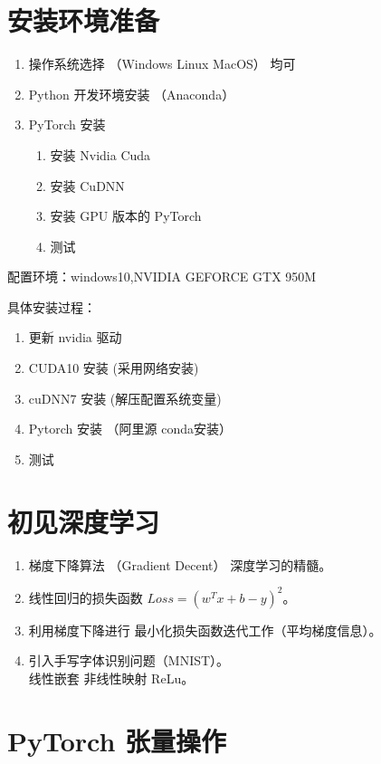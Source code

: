 \section{安装环境准备}
\begin{enumerate}
  \item 操作系统选择 （Windows Linux MacOS） 均可
  \item Python 开发环境安装 （Anaconda）
  \item PyTorch 安装
  \begin{enumerate}
    \item 安装 Nvidia Cuda
    \item 安装 CuDNN
    \item 安装 GPU 版本的 PyTorch
    \item 测试
  \end{enumerate}
\end{enumerate}

配置环境：windows10,NVIDIA GEFORCE GTX 950M

具体安装过程：
\begin{enumerate}
  \item 更新 nvidia 驱动
  \item CUDA10 安装 (采用网络安装)
  \item cuDNN7 安装 (解压配置系统变量)
  \item Pytorch 安装 （阿里源 conda安装）
  \item 测试
\end{enumerate}


\section{初见深度学习}

\begin{enumerate}
  \item 梯度下降算法 （Gradient Decent） 深度学习的精髓。
  \item 线性回归的损失函数 $Loss=(w^Tx+b-y)^2$。
  \item 利用梯度下降进行 最小化损失函数迭代工作（平均梯度信息）。
  \item 引入手写字体识别问题（MNIST）。 \\线性嵌套 非线性映射 ReLu。
\end{enumerate}





\newpage

\section{PyTorch 张量操作}

